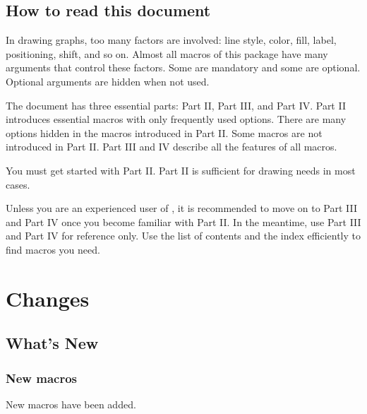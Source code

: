 \section{How to read this document}

In drawing graphs, too many factors are involved: line style, color, fill, label, positioning, shift, and so on.
Almost all macros of this package have many arguments that control these factors.
Some are mandatory and some are optional.
Optional arguments are hidden when not used.

The document has three essential parts: Part II, Part III, and Part IV.
Part II introduces essential macros with only frequently used options.
There are many options hidden in the macros introduced in Part II.
Some macros are not introduced in Part II.
Part III and IV describe all the features of all macros.

You must get started with Part II.
Part II is sufficient for drawing needs in most cases.

Unless you are an experienced user of \Tikz, it is recommended to move on to Part III and Part IV once you become familiar with Part II. In the meantime, use Part III and Part IV for reference only. Use the list of contents and the index efficiently to find macros you need.


\chapter{Changes}

\section{What's New}

\subsection{New macros}

New macros have been added.

